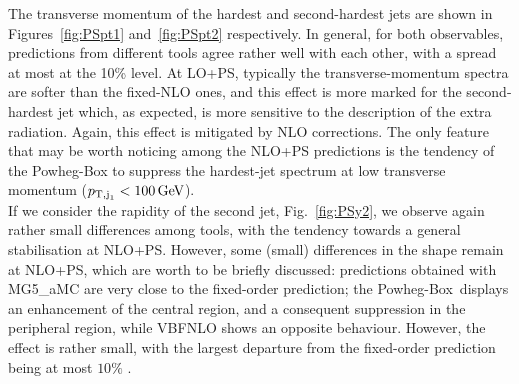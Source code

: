 The transverse momentum of the hardest and second-hardest jets are shown in Figures~\ref{fig:PSpt1} and~\ref{fig:PSpt2} respectively. In general, for both observables,
predictions from different tools agree rather well with each other, with a spread at most at the 10\% level. At LO+PS, typically the transverse-momentum spectra are softer than
the fixed-NLO ones, and this effect is more marked for the second-hardest jet which, as expected, is more sensitive to the description of the extra radiation. Again, this
effect is mitigated by NLO corrections. The only feature that may be worth noticing among the NLO+PS predictions is the tendency of the {\sc Powheg-Box} to suppress the
hardest-jet spectrum at low transverse momentum ($p_{\text{T},\text{j}_1}<100 \,\text{GeV}$).\\
If we consider the rapidity of the second jet, Fig.~\ref{fig:PSy2}, we observe again rather small differences among tools, with the tendency towards a general
stabilisation at NLO+PS. However, some (small) differences in the shape remain at NLO+PS, which are worth to be briefly discussed: predictions
obtained with {\sc MG5\_aMC} are very close to the fixed-order prediction; the {\sc Powheg-Box}\ displays an enhancement of the central region, and a consequent suppression in the
peripheral region, while {\sc VBFNLO} shows an opposite behaviour. However, the effect is rather small, with the largest departure from the fixed-order prediction being
at most $10\%$ .



